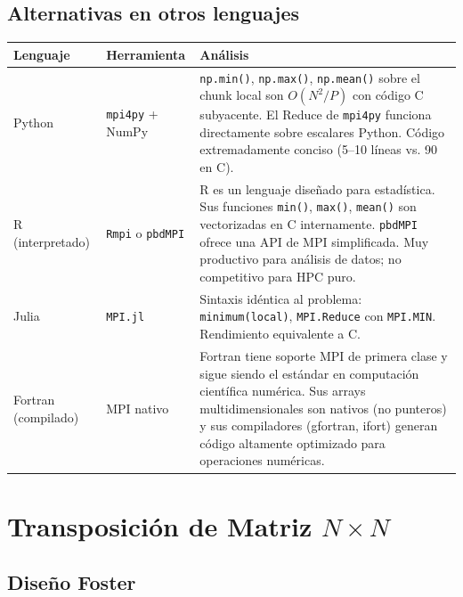 \documentclass[12pt,a4paper]{article}
\begin{document}
\subsection{Alternativas en otros lenguajes}

\begin{longtable}{L{2.5cm} L{3.5cm} L{7.5cm}}
\toprule
\textbf{Lenguaje} & \textbf{Herramienta} & \textbf{Análisis} \\
\midrule
\endhead
Python & \texttt{mpi4py} + NumPy & \texttt{np.min()}, \texttt{np.max()},
  \texttt{np.mean()} sobre el chunk local son $O(N^2/P)$ con código C subyacente.
  El Reduce de \texttt{mpi4py} funciona directamente sobre escalares Python.
  Código extremadamente conciso (5--10 líneas vs. 90 en C). \\[4pt]
R (interpretado) & \texttt{Rmpi} o \texttt{pbdMPI} & R es un lenguaje diseñado
  para estadística. Sus funciones \texttt{min()}, \texttt{max()}, \texttt{mean()}
  son vectorizadas en C internamente. \texttt{pbdMPI} ofrece una API de MPI
  simplificada. Muy productivo para análisis de datos; no competitivo para
  HPC puro. \\[4pt]
Julia & \texttt{MPI.jl} & Sintaxis idéntica al problema: \texttt{minimum(local)},
  \texttt{MPI.Reduce} con \texttt{MPI.MIN}. Rendimiento equivalente a C. \\[4pt]
Fortran (compilado) & MPI nativo & Fortran tiene soporte MPI de primera clase y
  sigue siendo el estándar en computación científica numérica. Sus arrays
  multidimensionales son nativos (no punteros) y sus compiladores (gfortran,
  ifort) generan código altamente optimizado para operaciones numéricas. \\
\bottomrule
\end{longtable}

\newpage

\section{Transposición de Matriz $N \times N$}

\subsection{Diseño Foster}
\end{document}
